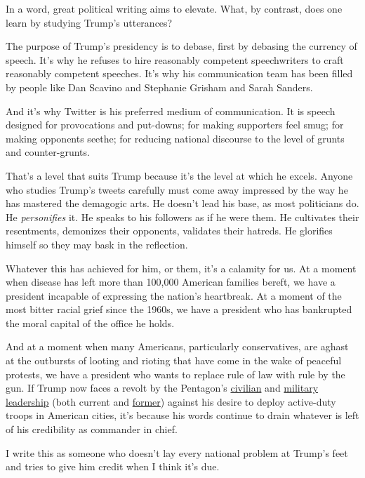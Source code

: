 In a word, great political writing aims to elevate. What, by contrast,
does one learn by studying Trump's utterances?

The purpose of Trump's presidency is to debase, first by debasing the
currency of speech. It's why he refuses to hire reasonably competent
speechwriters to craft reasonably competent speeches. It's why his
communication team has been filled by people like Dan Scavino and
Stephanie Grisham and Sarah Sanders.

And it's why Twitter is his preferred medium of communication. It is
speech designed for provocations and put-downs; for making supporters
feel smug; for making opponents seethe; for reducing national discourse
to the level of grunts and counter-grunts.

That's a level that suits Trump because it's the level at which he
excels. Anyone who studies Trump's tweets carefully must come away
impressed by the way he has mastered the demagogic arts. He doesn't lead
his base, as most politicians do. He \emph{personifies} it. He speaks to
his followers as if he were them. He cultivates their resentments,
demonizes their opponents, validates their hatreds. He glorifies himself
so they may bask in the reflection.

Whatever this has achieved for him, or them, it's a calamity for us. At
a moment when disease has left more than 100,000 American families
bereft, we have a president incapable of expressing the nation's
heartbreak. At a moment of the most bitter racial grief since the 1960s,
we have a president who has bankrupted the moral capital of the office
he holds.

And at a moment when many Americans, particularly conservatives, are
aghast at the outbursts of looting and rioting that have come in the
wake of peaceful protests, we have a president who wants to replace rule
of law with rule by the gun. If Trump now faces a revolt by the
Pentagon's
\href{https://www.nytimes.com/2020/06/03/us/politics/esper-milley-trump-protest.html}{civilian}
and
\href{https://int.nyt.com/data/documenthelper/6990-milley-memo/fc4fb1c4459fbdbc87a7/optimized/full.pdf\#page=1}{military
leadership} (both current and
\href{https://www.cnn.com/2020/06/05/politics/john-kelly-agrees-with-jim-mattis-on-trump/index.html}{former})
against his desire to deploy active-duty troops in American cities, it's
because his words continue to drain whatever is left of his credibility
as commander in chief.

I write this as someone who doesn't lay every national problem at
Trump's feet and tries to give him credit when I think it's due.


